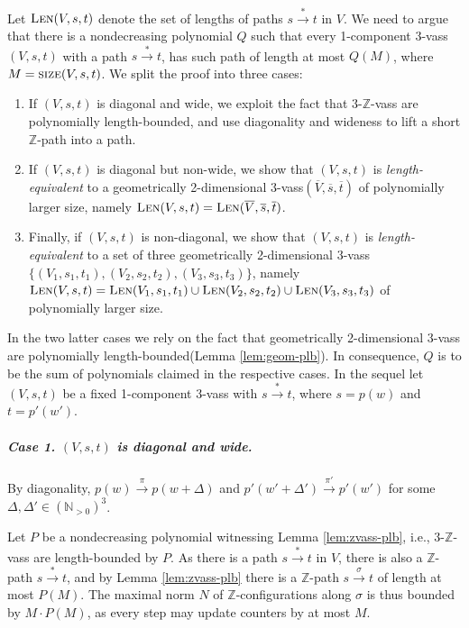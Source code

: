 \documentclass[a4paper, UKenglish, cleveref, autoref, thm-restate]{lipics-v2021}
\newcommand{\N}{\mathbb{N}}
\newcommand{\Z}{\mathbb{Z}}
\newcommand{\trans}[1]{\stackrel{#1}{\longrightarrow}}
\newcommand{\tran}{\trans{*}}
\newcommand{\size}{\textsc{size}}
\newcommand{\lb}{length-bounded\xspace}
\newcommand{\plb}{polynomially length-bounded\xspace}
\newcommand{\Len}[3]{\textsc{Len}(#1, #2, #3)}
\newcommand{\vass}{{\sc vass}\xspace}
\newcommand{\tvass}{\parvass 3}
\newcommand{\geomvass}{geometrically 2-dimensional \tvass}
\newcommand{\tzvass}{\parzvass 3}
\newcommand{\parvass}[1]{{$#1$-\vass}\xspace}
\newcommand{\parzvass}[1]{{$#1$-$\Z$-\vass}\xspace}
\newcommand{\para}[1]{\vspace{-3mm}\subparagraph*{\bf #1.}}
\newcommand{\Npos}{\N_{>0}}
\newcommand{\essdvass}[1]{\overline{#1}}
\begin{document}
Let $\Len V s t$ denote the set of lengths of paths $s\tran t$ in $V$.
We need to
argue that there is a nondecreasing polynomial $Q$ 
such that every 1-component \tvass $(V, s, t)$
with a path $s\tran t$, has such path of length at most $Q(M)$, where 
$M=\size(V, s,t)$.
We split the proof into three cases:
\smallskip
\begin{enumerate}
\item
If $(V,s,t)$ is diagonal and wide, we exploit the fact that \tzvass are \plb, and use diagonality and wideness to
lift a short $\Z$-path into a path.
\item
If $(V,s,t)$ is diagonal but non-wide, we show that $(V,s,t)$ is \emph{length-equivalent} to a 
\geomvass $(\essdvass V, \essdvass s, \essdvass t)$ of polynomially larger size, namely 
$\Len V s t = \Len {\essdvass V} {\essdvass s} {\essdvass t}$.
\item
Finally, if $(V, s, t)$ is non-diagonal, we show that $(V,s,t)$ is \emph{length-equivalent} to a set
of three
\geomvass $\{(V_1, s_1, t_1), (V_2, s_2, t_2), (V_3, s_3, t_3)\}$, namely 
$\Len V s t = \Len {V_1} {s_1} {t_1} \cup \Len {V_2} {s_2} {t_2} \cup \Len {V_3} {s_3} {t_3}$
of polynomially larger size.
\end{enumerate}
\smallskip
\noindent
In the two latter cases we rely on the fact that \geomvass are \plb (Lemma \ref{lem:geom-plb}).
In consequence, $Q$ is to be the sum of polynomials claimed in the respective cases.
In the sequel let $(V, s, t)$ be a fixed 1-component \tvass  with $s\tran t$, where
$s=p(w)$ and $t=p'(w')$.

\para{Case 1. $(V, s, t)$ is diagonal and wide}
By diagonality, $p(w) \trans{\pi} p(w+\Delta)$ and
$p'(w'+\Delta')\trans{\pi'} p'(w')$  for some $\Delta,\Delta'\in(\Npos)^3$.

Let $P$ be a nondecreasing polynomial witnessing Lemma \ref{lem:zvass-plb}, i.e.,
\tzvass are \lb by $P$.
As there is a path $s \tran t$ in $V$, there is also a $\Z$-path $s\tran t$, and
by Lemma \ref{lem:zvass-plb} there is a $\Z$-path $s \trans{\sigma} t$ of length at most $P(M)$.
The maximal norm $N$ of $\Z$-configurations along $\sigma$ is thus bounded by $M \cdot P(M)$,
as every step may update counters by at most $M$.
\end{document}
